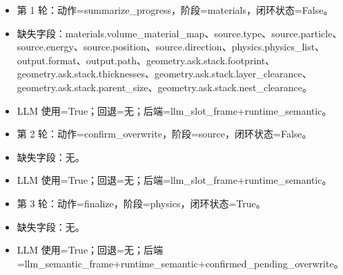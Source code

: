 \documentclass[11pt]{ctexart}
\begin{document}
\begin{itemize}
\item 第 1 轮：动作=summarize\_progress，阶段=materials，闭环状态=False。
\item 缺失字段：materials.volume\_material\_map、source.type、source.particle、source.energy、source.position、source.direction、physics.physics\_list、output.format、output.path、geometry.ask.stack.footprint、geometry.ask.stack.thicknesses、geometry.ask.stack.layer\_clearance、geometry.ask.stack.parent\_size、geometry.ask.stack.nest\_clearance。
\item LLM 使用=True；回退=无；后端=llm\_slot\_frame+runtime\_semantic。
\item 第 2 轮：动作=confirm\_overwrite，阶段=source，闭环状态=False。
\item 缺失字段：无。
\item LLM 使用=True；回退=无；后端=llm\_slot\_frame+runtime\_semantic。
\item 第 3 轮：动作=finalize，阶段=physics，闭环状态=True。
\item 缺失字段：无。
\item LLM 使用=True；回退=无；后端=llm\_semantic\_frame+runtime\_semantic+confirmed\_pending\_overwrite。
\end{itemize}
\end{document}
